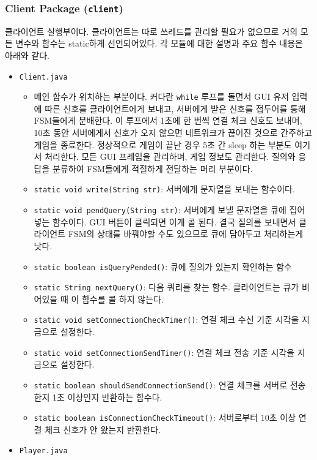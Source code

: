 \documentclass[a4paper, 10pt]{article}
\begin{document}
\subsubsection{Client Package (\texttt{client})}
클라이언트 실행부이다. 클라이언트는 따로 쓰레드를 관리할 필요가 없으므로
거의 모든 변수와 함수는 static하게 선언되어있다. 각 모듈에 대한 설명과 주요
함수 내용은 아래와 같다.
\begin{itemize}
  \item \texttt{Client.java}
  \begin{itemize}
    \item[] 메인 함수가 위치하는 부분이다. 커다란 \texttt{while} 루프를 돌면서 GUI 유저 입력에 따른 신호를 클라이언트에게 보내고,
    서버에게 받은 신호를 접두어를 통해 FSM들에게 분배한다. 이 루프에서 1초에 한 번씩 연결 체크 신호도 보내며, 10초 동안 서버에게서
    신호가 오지 않으면 네트워크가 끊어진 것으로 간주하고 게임을 종료한다. 정상적으로 게임이 끝난 경우 5초 간 sleep 하는 부분도 여기서 처리한다.
    모든 GUI 프레임을 관리하며, 게임 정보도 관리한다. 질의와 응답을 분류하여 FSM들에게 적절하게 전달하는 머리 부분이다.
    \item \texttt{static void write(String str)}: 서버에게 문자열을 보내는 함수이다.
    \item \texttt{static void pendQuery(String str)}: 서버에게 보낼 문자열을 큐에 집어넣는 함수이다.
    GUI 버튼이 클릭되면 이게 콜 된다. 결국 질의를 보내면서 클라이언트 FSM의 상태를 바꿔야할 수도 있으므로
    큐에 담아두고 처리하는게 낫다.
    \item \texttt{static boolean isQueryPended()}: 큐에 질의가 있는지 확인하는 함수
    \item \texttt{static String nextQuery()}: 다음 쿼리를 찾는 함수. 클라이언트는 큐가 비어있을 때 이 함수를 콜 하지 않는다.
    \item \texttt{static void setConnectionCheckTimer()}: 연결 체크 수신 기준 시각을 지금으로 설정한다.
    \item \texttt{static void setConnectionSendTimer()}: 연결 체크 전송 기준 시각을 지금으로 설정한다.
    \item \texttt{static boolean shouldSendConnectionSend()}: 연결 체크를 서버로 전송한지 1초 이상인지 반환하는 함수다.
    \item \texttt{static boolean isConnectionCheckTimeout()}: 서버로부터 10초 이상 연결 체크 신호가 안 왔는지 반환한다.
  \end{itemize}
  \item \texttt{Player.java}
  \begin{itemize}

\end{itemize}
\end{itemize}
\end{document}
